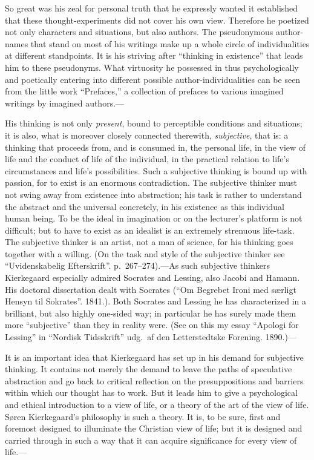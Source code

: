 \documentclass[12pt,a4paper]{book}
\newcommand{\opage}[1]{\marginnote{\footnotesize\textit{[#1]}}}
\begin{document}
So great was his zeal for personal truth that he expressly wanted it
established that these thought-experiments did not cover his own view.
Therefore he poetized not only characters and situations, but also
authors. The pseudonymous author-names that stand on most of his writings
make up a whole circle of individualities at different standpoints. It is
his striving after ``thinking in existence'' that leads him to these
pseudonyms. What virtuosity he possessed in
\opage{52}thus psychologically and poetically entering into different
possible author-individualities can be seen from the little work
``Prefaces,'' a collection of prefaces to various imagined writings by
imagined authors.---

His thinking is not only \textit{present}, bound to perceptible
conditions and situations; it is also, what is moreover closely connected
therewith, \textit{subjective}, that is: a thinking that proceeds from,
and is consumed in, the personal life, in the view of life and the
conduct of life of the individual, in the practical relation to life's
circumstances and life's possibilities. Such a subjective thinking is
bound up with passion, for to exist is an enormous contradiction. The
subjective thinker must not swing away from existence into abstraction;
his task is rather to understand the abstract and the universal
concretely, in his existence as this individual human being. To be the
ideal in imagination or on the lecturer's platform is not difficult; but
to have to exist as an idealist is an extremely strenuous life-task. The
subjective thinker is an artist, not a man of science, for his thinking
goes together with a willing. (On the task and style of the subjective
thinker see ``Uvidenskabelig Efterskrift''. p.~267--274).---As such
subjective thinkers Kierkegaard especially admired Socrates and Lessing,
also Jacobi and Hamann. His doctoral dissertation dealt with Socrates
(``Om Begrebet Ironi med særligt Hensyn til Sokrates''. 1841.). Both
Socrates and Lessing he has characterized in a brilliant, but also highly
one-sided way; in particular he has surely made them more ``subjective''
than they in reality were. (See on this my essay ``Apologi for Lessing''
in ``Nordisk Tidsskrift'' udg.\ af den Letterstedtske Forening.
1890.)---

It is an important idea that Kierkegaard has set up in his demand for
subjective thinking. It contains not
\opage{53}merely the demand to leave the paths of speculative abstraction
and go back to critical reflection on the presuppositions and barriers
within which our thought has to work. But it leads him to give a
psychological and ethical introduction to a view of life, or a theory of
the art of the view of life. Søren Kierkegaard's philosophy is such a
theory. It is, to be sure, first and foremost designed to illuminate the
Christian view of life; but it is designed and carried through in such a
way that it can acquire significance for every view of life.---
\end{document}
